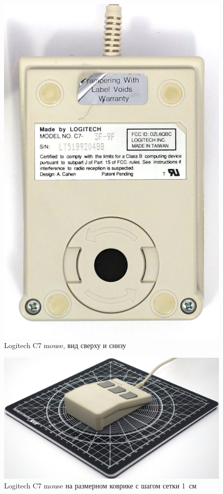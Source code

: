\documentclass[11pt, a4paper]{article}
\begin{document}
\begin{figure}[h]
    \includegraphics[scale=0.4]{1985_logitech_c7_mouse/bottom_30.jpg}
    \caption{Logitech C7 mouse, вид сверху и снизу}
    \label{fig:LogitechC7TopAndBottom}
\end{figure}

\begin{figure}[h]
    \centering
    \includegraphics[scale=0.35]{1985_logitech_c7_mouse/size_30.jpg}
    \caption{Logitech C7 mouse на размерном коврике с шагом сетки 1~см}
    \label{fig:LogitechC7Size}
\end{figure}
\end{document}
